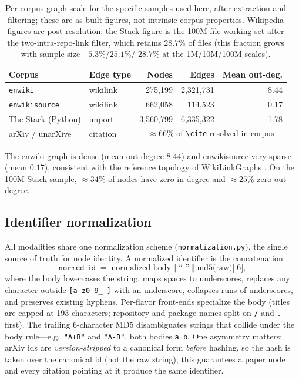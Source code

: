 \begin{table}[t]
  \centering
  \small
  \caption{Per-corpus graph scale for the specific samples used here, after
  extraction and filtering; these are as-built figures, not intrinsic corpus
  properties. Wikipedia figures are post-resolution; the Stack figure is the
  100M-file working set after the two-intra-repo-link filter, which retains
  $28.7\%$ of files (this fraction grows with sample size---$5.3\%$/$25.1\%$/
  $28.7\%$ at the 1M/10M/100M scales).}
  \label{tab:datasets:scale}
  \begin{tabular}{llrrr}
    \toprule
    Corpus & Edge type & Nodes & Edges & Mean out-deg. \\
    \midrule
    \texttt{enwiki}       & wikilink & 275{,}199 & 2{,}321{,}731 & 8.44 \\
    \texttt{enwikisource} & wikilink & 662{,}058 &   114{,}523 & 0.17 \\
    The Stack (Python)    & import   & 3{,}560{,}799 & 6{,}335{,}322 & 1.78 \\
    arXiv / unarXive      & citation & \multicolumn{3}{c}{$\approx 66\%$ of \texttt{\textbackslash cite} resolved in-corpus} \\
    \bottomrule
  \end{tabular}
\end{table}

The enwiki graph is dense (mean out-degree $8.44$) and enwikisource very sparse
(mean $0.17$), consistent with the reference topology of WikiLinkGraphs
\citep{consonni2019wikilinkgraphs}. On the 100M Stack sample, $\approx 34\%$ of
nodes have zero in-degree and $\approx 25\%$ zero out-degree.

\subsection{Identifier normalization}
\label{app:datasets:norm}

All modalities share one normalization scheme (\texttt{normalization.py}), the
single source of truth for node identity. A normalized identifier is the
concatenation
\[
\texttt{normed\_id} \;=\; \text{normalized\_body}\;\Vert\;\text{``\_''}\;\Vert\;\text{md5(raw)[:6]},
\]
where the body lowercases the string, maps spaces to underscores, replaces any
character outside \texttt{[a-z0-9\_-]} with an underscore, collapses runs of
underscores, and preserves existing hyphens. Per-flavor front-ends specialize the
body (titles are capped at 193 characters; repository and package names split on
\texttt{/} and \texttt{.} first). The trailing 6-character MD5 disambiguates
strings that collide under the body rule---e.g.\ \texttt{"A+B"} and
\texttt{"A-B"}, both bodies \texttt{a\_b}. One asymmetry matters: arXiv ids are
\emph{version-stripped} to a canonical form \emph{before} hashing, so the hash is
taken over the canonical id (not the raw string); this guarantees a paper node
and every citation pointing at it produce the same identifier.

